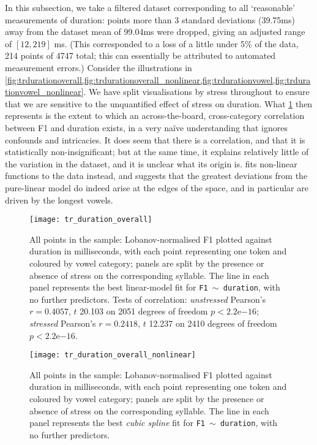 In this subsection, we take a filtered dataset corresponding to all `reasonable' measurements of duration: points more than 3 standard deviations (39.75ms) away from the dataset mean of 99.04ms were dropped, giving an adjusted range of $[12,219]$ ms. (This corresponded to a loss of a little under 5\% of the data, 214 points of 4747 total; this can essentially be attributed to automated measurement errors.) Consider the illustrations in \cref{fig:trdurationoverall,fig:trdurationoverall_nonlinear,fig:trdurationvowel,fig:trdurationvowel_nonlinear}. We have split visualisations by stress throughout to ensure that we are sensitive to the unquantified effect of stress on duration. What \cref{fig:trdurationoverall} then represents is the extent to which an across-the-board, cross-category correlation between F1 and duration exists, in a very naïve understanding that ignores confounds and intricacies. It does seem that there is a correlation, and that it is statistically non-insignificant; but at the same time, it explains relatively little of the variation in the dataset, and it is unclear what its origin is.  fits non-linear functions to the data instead, and suggests that the greatest deviations from the pure-linear model do indeed arise at the edges of the space, and in particular are driven by the longest vowels.



\begin{figure}[ht]
  \centering
  \texttt{[image: tr\_duration\_overall]}
  \caption[Duration plotted against F1 for all points in the sample.]{All points in the sample: Lobanov-normalised F1 plotted against duration in milliseconds, with each point representing one token and coloured by vowel category; panels are split by the presence or absence of stress on the corresponding syllable. The line in each panel represents the best linear-model fit for \texttt{F1 $\sim$ duration}, with no further predictors. Tests of correlation: \emph{unstressed} Pearson's $r = 0.4057$, $t$ 20.103 on 2051 degrees of freedom $p < 2.2$e$-16$; \emph{stressed} Pearson's $r = 0.2418$, $t$ 12.237 on 2410 degrees of freedom $p < 2.2$e$-16$.}
  \label{fig:trdurationoverall}
\end{figure}


\begin{figure}[ht]
  \centering
  \texttt{[image: tr\_duration\_overall\_nonlinear]}
  \caption[Duration plotted against F1 for all points in the sample, with cubic spline fit.]{All points in the sample: Lobanov-normalised F1 plotted against duration in milliseconds, with each point representing one token and coloured by vowel category; panels are split by the presence or absence of stress on the corresponding syllable. The line in each panel represents the best \emph{cubic spline} fit for \texttt{F1 $\sim$ duration}, with no further predictors.}
  \label{fig:trdurationoverall_nonlinear}
\end{figure}

